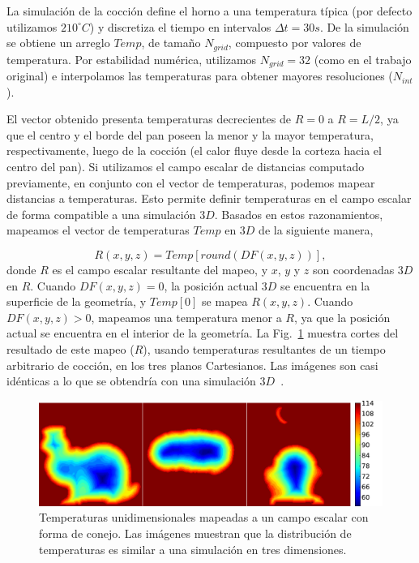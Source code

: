 \documentclass[spanish,a4paper,openright,11pt]{book}
\begin{document}
La simulación de la cocción define el horno a una temperatura típica (por defecto utilizamos $210^{\circ}C$) y discretiza el tiempo en intervalos $\Delta t = 30s$.
De la simulación se obtiene un arreglo $Temp$, de tamaño $N_{grid}$, compuesto por valores de temperatura.
Por estabilidad numérica, utilizamos $N_{grid}=32$ (como en el trabajo original) e interpolamos las temperaturas para obtener mayores resoluciones ($N_{int}$). 

El vector obtenido presenta temperaturas decrecientes de $R = 0$ a $R = L/2$, ya que el centro y el borde del pan poseen la menor y la mayor temperatura, respectivamente, luego de la cocción (el calor fluye desde la corteza hacia el centro del pan). 
Si utilizamos el campo escalar de distancias computado previamente, en conjunto con el vector de temperaturas, podemos mapear distancias a temperaturas.
Esto permite definir temperaturas en el campo escalar de forma compatible a una simulación $3D$.
Basados en estos razonamientos, mapeamos el vector de temperaturas $Temp$ en $3D$ de la siguiente manera,

\begin{equation*}
\displaystyle R(x,y,z) = Temp[ round( DF(x,y,z) ) ], 
\end{equation*}
%
donde $R$ es el campo escalar resultante del mapeo, y $x$, $y$ y $z$ son coordenadas $3D$ en $R$. Cuando $DF(x,y,z) = 0$, la posición actual $3D$ se encuentra en la superficie de la geometría, y $Temp[0]$ se mapea $R(x,y,z)$.
Cuando $DF(x,y,z) > 0$, mapeamos una temperatura menor a $R$, ya que la posición actual se encuentra en el interior de la geometría.
La Fig.~\ref{fg:baking} muestra cortes del resultado de este mapeo ($R$), usando temperaturas resultantes de un tiempo arbitrario de cocción, en los tres planos Cartesianos. 
Las imágenes son casi idénticas a lo que se obtendría con una simulación $3D$~\cite{Purlis2010}.

\begin{figure}
\includegraphics[width=15cm]{figures/tempsbunny}
\caption{Temperaturas unidimensionales mapeadas a un campo escalar con forma de conejo. Las imágenes muestran que la distribución de temperaturas es similar a una simulación en tres dimensiones.}
\label{fg:baking}
\end{figure}
\end{document}
